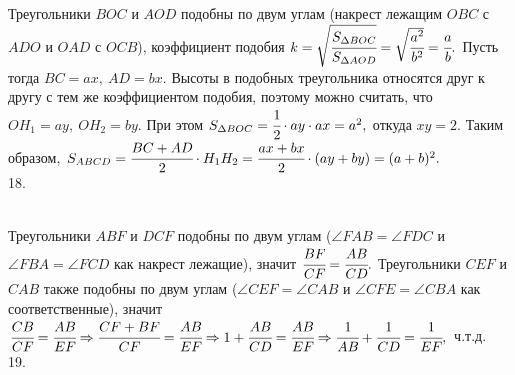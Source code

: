 \documentclass[12pt]{article}
\begin{document}
Треугольники $BOC$ и $AOD$ подобны по двум углам (накрест лежащим $OBC$ с $ADO$ и $OAD$ с $OCB$), коэффициент подобия $k=\sqrt{\cfrac{S_{\Delta BOC}}{S_{\Delta AOD}}}=\sqrt{\cfrac{a^2}{b^2}}=\cfrac{a}{b}.$ Пусть тогда $BC=ax,\ AD=bx.$ Высоты в подобных треугольника относятся друг к другу с тем же коэффициентом подобия, поэтому можно считать, что $OH_1=ay,\ OH_2=by.$ При этом $S_{\Delta BOC}=\cfrac{1}{2}\cdot ay\cdot ax=a^2,$ откуда $xy=2.$ Таким образом, $S_{ABCD}=\cfrac{BC+AD}{2}\cdot H_1H_2=\cfrac{ax+bx}{2}\cdot(ay+by)=(a+b)^2.$\\
18. \begin{figure}[ht!]
\end{figure}\\
Треугольники $ABF$ и $DCF$ подобны по двум углам ($\angle FAB=\angle FDC$ и $\angle FBA=\angle FCD$ как накрест лежащие), значит $\cfrac{BF}{CF}=\cfrac{AB}{CD}.$ Треугольники $CEF$ и $CAB$ также подобны по двум углам ($\angle CEF=\angle CAB$ и $\angle CFE=\angle CBA$ как соответственные), значит $\cfrac{CB}{CF}=\cfrac{AB}{EF}\Rightarrow \cfrac{CF+BF}{CF}=\cfrac{AB}{EF}\Rightarrow 1+\cfrac{AB}{CD}=\cfrac{AB}{EF}
\Rightarrow \cfrac{1}{AB}+\cfrac{1}{CD}=\cfrac{1}{EF},$ ч.т.д.\\
19. \begin{figure}[ht!]
\end{figure}\\
\end{document}
